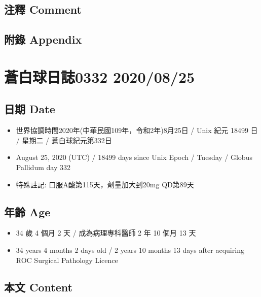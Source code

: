 \documentclass[a5paper, 11pt
]{book}
\providecommand{\tightlist}{%
  \setlength{\itemsep}{0pt}\setlength{\parskip}{0pt}}
\begin{document}
\hypertarget{ux6ce8ux91cb-comment-72}{%
\subsection{注釋 Comment}\label{ux6ce8ux91cb-comment-72}}

\hypertarget{ux9644ux9304-appendix-72}{%
\subsection{附錄 Appendix}\label{ux9644ux9304-appendix-72}}

\hypertarget{ux84bcux767dux7403ux65e5ux8a8c0332-20200825}{%
\section{蒼白球日誌0332
2020/08/25}\label{ux84bcux767dux7403ux65e5ux8a8c0332-20200825}}

\hypertarget{ux65e5ux671f-date-73}{%
\subsection{日期 Date}\label{ux65e5ux671f-date-73}}

\begin{itemize}
\tightlist
\item
  世界協調時間2020年(中華民國109年，令和2年)8月25日 / Unix 紀元 18499 日
  / 星期二 / 蒼白球紀元第332日
\item
  August 25, 2020 (UTC) / 18499 days since Unix Epoch / Tuesday / Globus
  Pallidum day 332
\item
  特殊註記: 口服A酸第115天，劑量加大到20mg QD第89天
\end{itemize}

\hypertarget{ux5e74ux9f61-age-73}{%
\subsection{年齡 Age}\label{ux5e74ux9f61-age-73}}

\begin{itemize}
\tightlist
\item
  34 歲 4 個月 2 天 / 成為病理專科醫師 2 年 10 個月 13 天
\item
  34 years 4 months 2 days old / 2 years 10 months 13 days after
  acquiring ROC Surgical Pathology Licence
\end{itemize}

\hypertarget{ux672cux6587-content-73}{%
\subsection{本文 Content}\label{ux672cux6587-content-73}}
\end{document}
